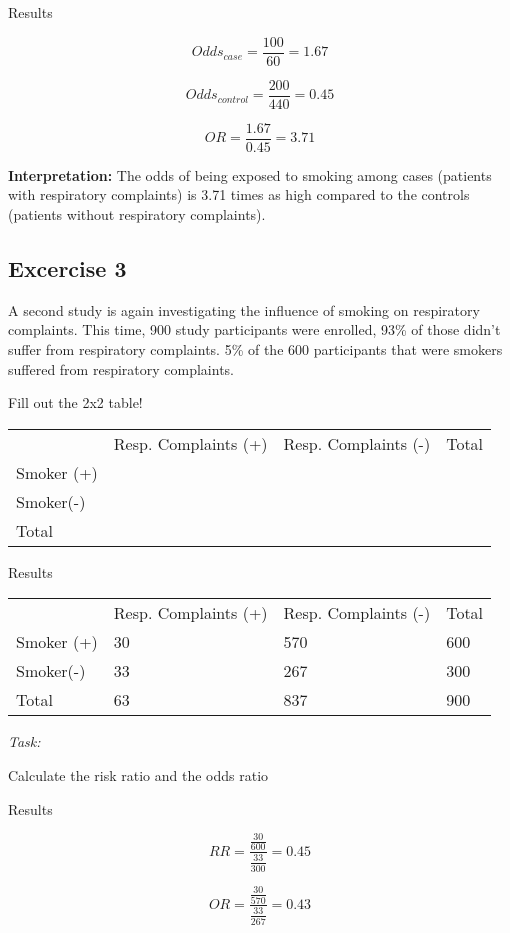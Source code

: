 \documentclass[
  letterpaper,
  paper=6in:9in,
  pagesize=pdftex,
  headinclude=on,
  footinclude=on,
  12pt]{scrbook}
\begin{document}
Results

\[
Odds_{case} = \frac{100}{60} = 1.67
\]

\[
Odds_{control} = \frac{200}{440} = 0.45
\]

\[
OR = \frac{1.67}{0.45} = 3.71
\]

\textbf{Interpretation:} The odds of being exposed to smoking among
cases (patients with respiratory complaints) is 3.71 times as high
compared to the controls (patients without respiratory complaints).

\hypertarget{excercise-3-1}{%
\subsection{Excercise 3}\label{excercise-3-1}}

A second study is again investigating the influence of smoking on
respiratory complaints. This time, 900 study participants were enrolled,
93\% of those didn't suffer from respiratory complaints. 5\% of the 600
participants that were smokers suffered from respiratory complaints.

Fill out the 2x2 table!

\begin{longtable}[]{@{}llll@{}}
\toprule\noalign{}
\endhead
\bottomrule\noalign{}
\endlastfoot
& Resp. Complaints (+) & Resp. Complaints (-) & Total \\
Smoker (+) & & & \\
Smoker(-) & & & \\
Total & & & \\
\end{longtable}

Results

\begin{longtable}[]{@{}llll@{}}
\toprule\noalign{}
\endhead
\bottomrule\noalign{}
\endlastfoot
& Resp. Complaints (+) & Resp. Complaints (-) & Total \\
Smoker (+) & 30 & 570 & 600 \\
Smoker(-) & 33 & 267 & 300 \\
Total & 63 & 837 & 900 \\
\end{longtable}

\emph{Task:}

Calculate the risk ratio and the odds ratio

Results

\[
RR = \frac{\frac{30}{600}}{\frac{33}{300}} = 0.45
\]

\[
OR = \frac{\frac{30}{570}}{\frac{33}{267}} = 0.43
\]
\end{document}
